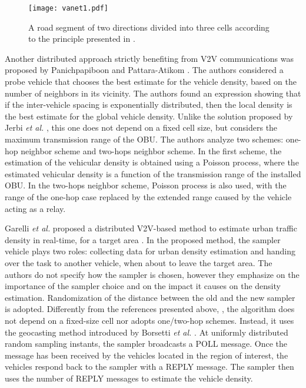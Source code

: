 \documentclass[10pt,onecolumn]{article}
\begin{document}
\begin{figure}[h]
\centering
\texttt{[image: vanet1.pdf]}
\caption{A road segment of two directions divided into three cells according to the principle presented in \cite{Jerbi2007}.}
\label{fig:Jerbi}
\end{figure} 

Another distributed approach strictly benefiting from V2V communications was proposed by Panichpapiboon and Pattara-Atikom \cite{Panichpapiboon2008}. The authors considered a probe vehicle that chooses the best estimate for the vehicle density, based on the number of neighbors in its vicinity. The authors found an expression showing that if the inter-vehicle spacing is exponentially distributed, then the local density is the best estimate for the global vehicle density. Unlike the solution proposed by Jerbi \textit{et al.} \cite{Jerbi2007}, this one does not depend on a fixed cell size, but considers the maximum transmission range of the OBU.
The authors analyze two schemes: one-hop neighbor scheme and two-hops neighbor scheme. In the first scheme, the estimation of the vehicular density 
is obtained using a Poisson process, where the estimated vehicular density is a function of the transmission range of the installed OBU. In the two-hops neighbor scheme, Poisson process is also used, with the range of the one-hop case replaced by the extended range caused by the vehicle acting as a relay.

Garelli \textit{et al.} proposed a distributed V2V-based method to estimate urban traffic density in real-time, for a target area \cite{Garelli2011}. In the proposed method, the sampler vehicle plays two roles: collecting data for urban density estimation and handing over the task to another vehicle, when about to leave the target area.
The authors do not specify how the sampler is chosen, however they emphasize on the importance of the sampler choice and on the impact it causes on the density estimation. Randomization of the distance between the old and the new sampler is adopted. 
Differently from the references presented above, \cite{Jerbi2007, Panichpapiboon2008}, the algorithm does not depend on a fixed-size cell nor adopts one/two-hop schemes. Instead, it uses the geocasting method introduced by Borsetti \textit{et al.} \cite{geocasting}. 
At uniformly distributed random sampling instants, the sampler broadcasts a POLL message. Once the message has been received by the vehicles located in the region of interest, the vehicles respond back to the sampler with a REPLY message. The sampler then uses the number of REPLY messages to estimate the vehicle density. 
\end{document}
